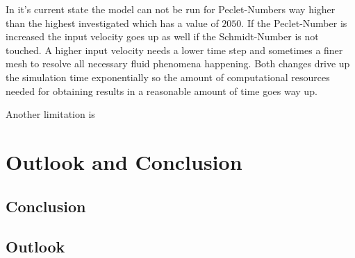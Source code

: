 \documentclass[../thesis.tex]{subfiles}
\begin{document}
In it's current state the model can not be run for Peclet-Numbers way higher than the highest investigated which has a value of $2050$. If the Peclet-Number is increased the input velocity goes up as well if the Schmidt-Number is not touched. A higher input velocity needs a lower time step and sometimes a finer mesh to resolve all necessary fluid phenomena happening. Both changes drive up the simulation time exponentially so the amount of computational resources needed for obtaining results in a reasonable amount of time goes way up.

Another limitation is

\chapter{Outlook and Conclusion}
\label{chp:out_con}

\section{Conclusion}

\section{Outlook}
\end{document}
